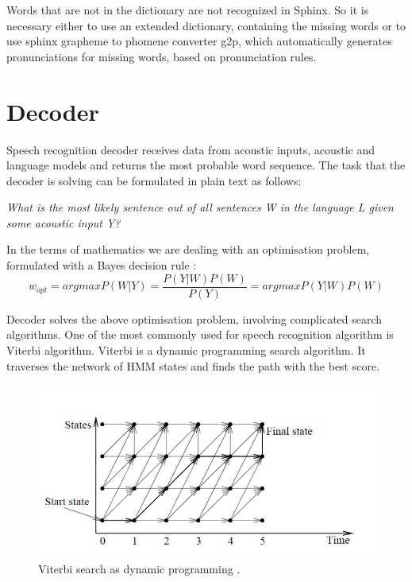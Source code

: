 Words that are not in the dictionary are not recognized in Sphinx. So it is
necessary either to use an extended dictionary, containing the missing words or to use 
sphinx  grapheme to phomene converter g2p, which automatically generates
pronunciations for missing words, based on pronunciation rules.  

 
\section {Decoder}
Speech recognition decoder receives data from acoustic inputs, acoustic and
language models and returns the most probable word sequence. The task that the decoder is solving can be
formulated in plain text as follows:
\begin {center}
\textit {What is the most likely sentence out of all
sentences W in the language L given some acoustic input Y? }
\end {center}
In the terms of mathematics we are dealing with an optimisation problem,
formulated with a Bayes decision rule \parencite {jurafskymartin2009}:
\[w_{opt} = argmax P(W|Y ) = \frac {P(Y |W)P(W)} {P(Y)} = argmax P(Y |W)P(W)\]

Decoder solves the above optimisation problem, involving complicated search algorithms. One of the most commonly used for speech recognition algorithm is 
Viterbi algorithm. Viterbi is a dynamic programming search algorithm. It traverses the network of HMM states and 
finds the path with the best score.

\begin{figure}[htbp]
  \centering
    \includegraphics[width=1.0\textwidth]{images/viterbi.png}
 \caption{Viterbi search as dynamic programming \parencite
{Ravishankar96efficientalgorithms}.}
  \label{fig:hmm}
\end {figure}

